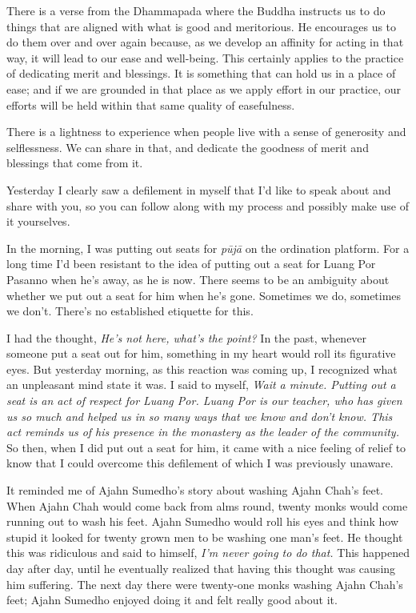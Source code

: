 There is a verse from the Dhammapada where the Buddha instructs us to 
do things that are aligned with what is good and meritorious. He 
encourages us to do them over and over again because, as we develop an 
affinity for acting in that way, it will lead to our ease and 
well-being. This certainly applies to the practice of dedicating merit 
and blessings. It is something that can hold us in a place of ease; and 
if we are grounded in that place as we apply effort in our practice, 
our efforts will be held within that same quality of easefulness.

There is a lightness to experience when people live with a sense of 
generosity and selflessness. We can share in that, and dedicate the 
goodness of merit and blessings that come from it.


Yesterday I clearly saw a defilement in myself that I'd like to speak 
about and share with you, so you can follow along with my process and 
possibly make use of it yourselves.

In the morning, I was putting out seats for \emph{pūjā} on the 
ordination platform. For a long time I'd been resistant to the idea of 
putting out a seat for Luang Por Pasanno when he's away, as he is now. 
There seems to be an ambiguity about whether we put out a seat for him 
when he's gone. Sometimes we do, sometimes we don't. There's no 
established etiquette for this.

I had the thought, \emph{He's not here, what's the point?} In the past, 
whenever someone put a seat out for him, something in my heart would 
roll its figurative eyes. But yesterday morning, as this reaction was 
coming up, I recognized what an unpleasant mind state it was. I said to 
myself, \emph{Wait a minute. Putting out a seat is an act of respect 
for Luang Por. Luang Por is our teacher, who has given us so much and 
helped us in so many ways that we know and don't know. This act reminds 
us of his presence in the monastery as the leader of the community.} So 
then, when I did put out a seat for him, it came with a nice feeling of 
relief to know that I could overcome this defilement of which I was 
previously unaware.

It reminded me of Ajahn Sumedho's story about washing Ajahn Chah's 
feet. When Ajahn Chah would come back from alms round, twenty monks 
would come running out to wash his feet. Ajahn Sumedho would roll his 
eyes and think how stupid it looked for twenty grown men to be washing 
one man's feet. He thought this was ridiculous and said to himself, 
\emph{I'm never going to do that.} This happened day after day, until 
he eventually realized that having this thought was causing him 
suffering. The next day there were twenty-one monks washing Ajahn 
Chah's feet; Ajahn Sumedho enjoyed doing it and felt really good about 
it.

